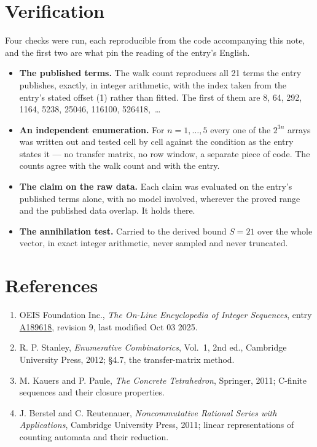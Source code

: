\documentclass[11pt]{article}
\theoremstyle{definition}
\begin{document}
\section{Verification}

Four checks were run, each reproducible from the code accompanying this note, and the first two are what pin the reading of the entry's English.

\begin{itemize}

\item {\bfseries The published terms.} The walk count reproduces all 21 terms the entry publishes, exactly, in integer arithmetic, with the index taken from the entry's stated offset (1) rather than fitted. The first of them are 8, 64, 292, 1164, 5238, 25046, 116100, 526418,~\dots

\item {\bfseries An independent enumeration.} For $n = 1,\dots,5$ every one of the $2^{3n}$ arrays was written out and tested cell by cell against the condition as the entry states it --- no transfer matrix, no row window, a separate piece of code. The counts agree with the walk count and with the entry.

\item {\bfseries The claim on the raw data.} Each claim was evaluated on the entry's published terms alone, with no model involved, wherever the proved range and the published data overlap. It holds there.

\item {\bfseries The annihilation test.} Carried to the derived bound $S = 21$ over the whole vector, in exact integer arithmetic, never sampled and never truncated.

\end{itemize}

\section{References}

\begin{enumerate}

\item OEIS Foundation Inc., \emph{The On-Line Encyclopedia of Integer Sequences}, entry \href{https://oeis.org/A189618}{A189618}, revision 9, last modified Oct 03 2025.

\item R. P. Stanley, \emph{Enumerative Combinatorics}, Vol.~1, 2nd ed., Cambridge University Press, 2012; \S4.7, the transfer-matrix method.

\item M. Kauers and P. Paule, \emph{The Concrete Tetrahedron}, Springer, 2011; C-finite sequences and their closure properties.

\item J. Berstel and C. Reutenauer, \emph{Noncommutative Rational Series with Applications}, Cambridge University Press, 2011; linear representations of counting automata and their reduction.

\end{enumerate}
\end{document}
